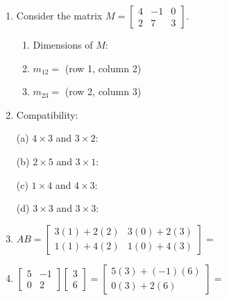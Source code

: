 \documentclass[10pt]{article}
\begin{document}

\vspace{0.12in}

\begin{enumerate}[leftmargin=1.6em, itemsep=14pt]

\item Consider the matrix $M = \begin{bmatrix}4 & -1 & 0 \\ 2 & 7 & 3\end{bmatrix}$.
\begin{enumerate}[label=(\alph*), itemsep=6pt]
  \item Dimensions of $M$: 
  \item $m_{12} = $  \quad (row 1, column 2)
  \item $m_{23} = $  \quad (row 2, column 3)
\end{enumerate}

\vspace{0.2in}

\item Compatibility:

\medskip
(a) $4\times 3$ and $3\times 2$: 

\smallskip
(b) $2\times 5$ and $3\times 1$: 

\smallskip
(c) $1\times 4$ and $4\times 3$: 

\smallskip
(d) $3\times 3$ and $3\times 3$: 

\vspace{0.2in}

\item $AB = \begin{bmatrix}3(1)+2(2) & 3(0)+2(3) \\ 1(1)+4(2) & 1(0)+4(3)\end{bmatrix}
= $ 

\vspace{0.2in}

\item $\begin{bmatrix}5 & -1 \\ 0 & 2\end{bmatrix}\begin{bmatrix}3 \\ 6\end{bmatrix}
= \begin{bmatrix}5(3)+(-1)(6) \\ 0(3)+2(6)\end{bmatrix}
= $ 


\end{enumerate}
\end{document}
